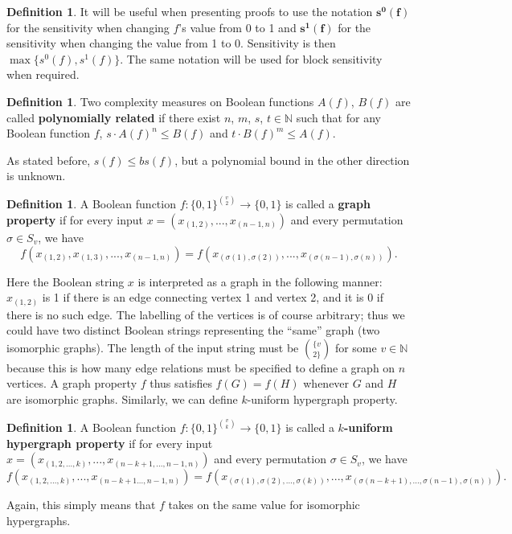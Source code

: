 \documentclass[psamsfonts]{amsart}
\theoremstyle{definition}
\newtheorem{defn}[theorem]{Definition}
\theoremstyle{remark}
\numberwithin{equation}{section}
\begin{document}
\begin{defn}\label{oneandzero}
It will be useful when presenting proofs to use the notation $\boldsymbol{s^{0}(f)}$ for the sensitivity when changing $f$'s value from 0 to 1 
and $\boldsymbol{s^{1}(f)}$ for the sensitivity when changing 
the value from 1 to 0.  Sensitivity is then $\max \{ s^{0}(f), s^{1}(f)\}$.  The same notation will be used for block sensitivity when required.  
\end{defn}

\begin{defn}
Two complexity measures on Boolean functions $A(f)$, $B(f)$ are called \textbf{polynomially related} if there exist $n$, $m$, $s$, $t \in \mathbb{N}$ such that 
for any Boolean function $f$, $s \cdot A(f)^{n} \leq B(f)$ and $t \cdot B(f)^{m} \leq A(f)$.  
\end{defn}

As stated before, $s(f) \leq bs(f)$, but a polynomial bound in the other direction is unknown.  

		\begin{defn}
	A Boolean function $f: \{0,1\}^{v \choose{2}} \to \{0,1\}$ is called a \textbf{graph property} if for every input $x = (x_{(1,2)},...,x_{(n-1,n)})$ and every permutation $\sigma \in S_v$, we have
			\begin{equation}
				f(x_{(1,2)},x_{(1,3)},...,x_{(n-1,n)}) = f(x_{(\sigma (1), \sigma (2))},...,x_{(\sigma (n-1), \sigma (n))}). \nonumber
			\end{equation}
		\end{defn}
Here the Boolean string $x$ is interpreted as a graph in the following manner: $x_{(1,2)}$ is 1 if there is an edge connecting vertex 1 and vertex 2, and it is 0 if there is no such edge.  
The labelling of the vertices is of course arbitrary; thus we could have two distinct Boolean strings representing the ``same'' graph (two isomorphic graphs).  The length of the input string 
must be $\{v \choose{2}\}$ for some $v \in \mathbb{N}$ because this is how many edge relations must be specified to define a graph on $n$ vertices.  A graph property $f$ thus satisfies $f(G) = f(H)$ whenever $G$ and $H$ are isomorphic graphs.	Similarly, we can define $k$-uniform hypergraph property.
			\begin{defn}
				A Boolean function $f: \{0,1\}^{v \choose{k}} \to \{0,1\}$ is called a \textbf{$k$-uniform hypergraph property} if for every input $x = (x_{(1,2,...,k)},...,x_{(n-k+1,...,n-1,n)})$ and every permutation $\sigma \in S_v$, we have
			\begin{equation}
				f(x_{(1,2,...,k)},...,x_{(n-k+1...,n-1,n)}) = f(x_{(\sigma (1), \sigma (2),..., \sigma(k))},...,x_{(\sigma (n-k+1),...,\sigma (n-1), \sigma (n))}). \nonumber
			\end{equation}
			\end{defn}
Again, this simply means that $f$ takes on the same value for isomorphic hypergraphs.
\end{document}
